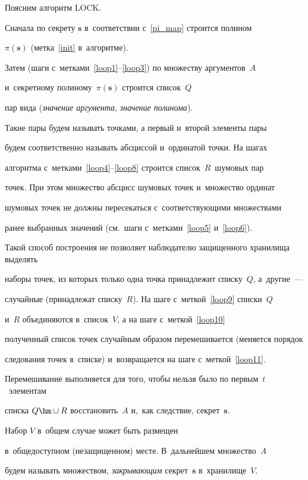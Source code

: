 Поясним алгоритм \textrm{LOCK}. 


Сначала по секрету $\mathbf{s}$ в~соответствии с~\eqref{pi_map} строится полином 


$\pi(\mathbf{s})$ (метка~\ref{init} в~алгоритме). 


Затем (шаги с~метками~\ref{loop1}--\ref{loop3}) по множеству аргументов~$A$ 


и~секретному полиному~$\pi(\mathbf{s})$ строится список~$Q$ 


пар вида (\textit{значение аргумента}, \textit{значение полинома}).


 Такие пары будем называть точками, а первый и~второй элементы пары 


 будем соответственно называть абсциссой и~ординатой точки. На шагах


  алгоритма с~метками~\ref{loop4}--\ref{loop8} строится список~$R$~шумовых пар 


  точек. При этом множество абсцисс шумовых точек и~множество ординат  


  шумовых точек не должны пересекаться с~соответствующими множествами 


  ранее выбранных значений (см.\ шаги с~метками~\ref{loop5} и~\ref{loop6}). 


  Такой способ построения не позволяет наблюдателю защищенного хранилища выделять 


  наборы точек, из которых только одна точка принадлежит списку~$Q$, а~другие~--- 


  случайные (принадлежат списку~$R$). На шаге с~меткой~\ref{loop9} списки~$Q$ 


  и~$R$ объединяются в~список~$V$, а на шаге с~меткой~\ref{loop10} 


  полученный список точек случайным образом перемешивается (меняется порядок 


  следования точек в~списке) и~возвращается на шаге с~меткой~\ref{loop11}. 


  Перемешивание выполняется для того, чтобы нельзя было по первым~$t$~элементам 


  списка $Q\hm\cup R$ восстановить~$A$ и,~как следствие, секрет~$\mathbf{s}$.





Набор $V$ в~общем случае может быть размещен 


в~общедоступном (незащищенном) месте. В~дальнейшем множество~$A$ 


будем называть множеством, \textit{за\-кры\-ва\-ющим} секрет~$\mathbf{s}$ в~хранилище~$V$. 


